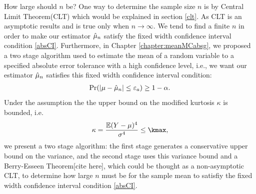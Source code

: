 \documentclass{iitthesis}
\begin{document}
How large should $n$ be? One way to determine the sample size $n$ is by Central Limit Theorem(CLT) which would be explained in section \ref{clt}. As CLT is an asymptotic results and is true only when $n \to \infty$. We tend to find a finite $n$ in order to make our estimator $\hat{\mu}_n$ satisfy the fixed width confidence interval condition \eqref{absCI}. Furthermore, in Chapter \ref{chapter:meanMCabsg}, we proposed a two stage algorithm used to estimate the mean of a random variable to a specified absolute error tolerance with a high confidence level, i.e., we want our estimator $\hat{\mu}_n$ satisfies this fixed width confidence interval condition:
\begin{align}\label{absCI}
\Pr(\left \lvert \mu-\hat{\mu}_n \right \rvert \leq \varepsilon_a) \geq 1-\alpha.
\end{align} 
Under the assumption the the upper bound on the modified kurtosis $\kappa$ is bounded, i.e.
\begin{align}
\kappa = \frac{\e(Y-\mu)^4}{\sigma^4} \leq \kmax,
\end{align}
we present a two stage algorithm: the first stage generates a conservative upper bound on the variance, and the second stage uses this variance bound and a Berry-Esseen Theorem[cite here], which could be thought as a non-asymptotic CLT, to determine how large $n$ must be for the sample mean to satisfiy the fixed width confidence interval condition \eqref{absCI}.
\end{document}
